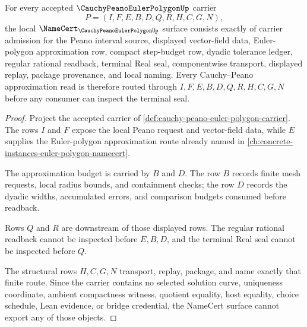 \begin{theorem}
\label{thm:cauchy-peano-euler-polygon-namecert-obligations}
For every accepted $\CauchyPeanoEulerPolygonUp$ carrier
$$
P=(I,F,E,B,D,Q,R,H,C,G,N),
$$
the local $\NameCert_{\CauchyPeanoEulerPolygonUp}$ surface consists exactly of carrier admission for the Peano interval source, displayed vector-field data, Euler-polygon approximation row, compact step-budget row, dyadic tolerance ledger, regular rational readback, terminal Real seal, componentwise transport, displayed replay, package provenance, and local naming. Every Cauchy--Peano approximation read is therefore routed through $I,F,E,B,D,Q,R,H,C,G,N$ before any consumer can inspect the terminal seal.
\end{theorem}
\begin{proof}
Project the accepted carrier of \autoref{def:cauchy-peano-euler-polygon-carrier}. The rows $I$ and $F$ expose the local Peano request and vector-field data, while $E$ supplies the Euler-polygon approximation route already named in \autoref{ch:concrete-instances-euler-polygon-namecert}.

The approximation budget is carried by $B$ and $D$. The row $B$ records finite mesh requests, local radius bounds, and containment checks; the row $D$ records the dyadic widths, accumulated errors, and comparison budgets consumed before readback.

Rows $Q$ and $R$ are downstream of those displayed rows. The regular rational readback cannot be inspected before $E,B,D$, and the terminal Real seal cannot be inspected before $Q$.

The structural rows $H,C,G,N$ transport, replay, package, and name exactly that finite route. Since the carrier contains no selected solution curve, uniqueness coordinate, ambient compactness witness, quotient equality, host equality, choice schedule, Lean evidence, or bridge credential, the NameCert surface cannot export any of those objects.
\end{proof}

